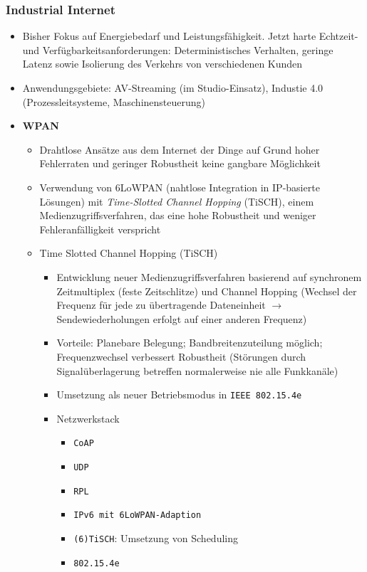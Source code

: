 \subsubsection{Industrial Internet}
\begin{itemize}
	\item Bisher Fokus auf Energiebedarf und Leistungsfähigkeit. Jetzt harte Echtzeit- und Verfügbarkeitsanforderungen: Deterministisches Verhalten, geringe Latenz sowie Isolierung des Verkehrs von verschiedenen Kunden
	\item Anwendungsgebiete: AV-Streaming (im Studio-Einsatz), Industie 4.0 (Prozessleitsysteme, Maschinensteuerung)
	\item \textbf{WPAN}
	\begin{itemize}
		\item Drahtlose Ansätze aus dem Internet der Dinge auf Grund hoher Fehlerraten und geringer Robustheit keine gangbare Möglichkeit
		\item Verwendung von 6LoWPAN (nahtlose Integration in IP-basierte Lösungen) mit \textit{Time-Slotted Channel Hopping} (TiSCH), einem Medienzugriffsverfahren, das eine hohe Robustheit und weniger Fehleranfälligkeit verspricht
		\item Time Slotted Channel Hopping (TiSCH)
		\begin{itemize}
			\item Entwicklung neuer Medienzugriffsverfahren basierend auf synchronem Zeitmultiplex (feste Zeitschlitze) und Channel Hopping (Wechsel der Frequenz für jede zu übertragende Dateneinheit \(\rightarrow\) Sendewiederholungen erfolgt auf einer anderen Frequenz)
			\item Vorteile: Planebare Belegung; Bandbreitenzuteilung möglich; Frequenzwechsel verbessert Robustheit (Störungen durch Signalüberlagerung betreffen normalerweise nie alle Funkkanäle)
			\item Umsetzung als neuer Betriebsmodus in \texttt{IEEE 802.15.4e}
			\item Netzwerkstack
			\begin{itemize}
				\item \texttt{CoAP}
				\item \texttt{UDP}
				\item \texttt{RPL}
				\item \texttt{IPv6 mit 6LoWPAN-Adaption}
				\item \texttt{(6)TiSCH}: Umsetzung von Scheduling
				\item \texttt{802.15.4e}
			\end{itemize}

\end{itemize}
\end{itemize}
\end{itemize}

